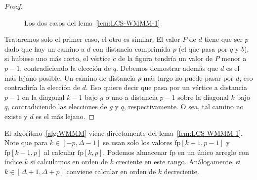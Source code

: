 \begin{proof}
\begin{figure}[ht]
      \caption{Los dos casos del lema~\ref{lem:LCS-WMMM-1}}
      \label{fig:LCS-WMMM-lemma-1}
    \end{figure}
    Trataremos solo el primer caso,
    el otro es similar.
    El valor \(P\) de \(d\) tiene que ser \(p\)
    dado que hay un camino a \(d\) con distancia comprimida \(p\)
    (el que pasa por \(q\) y \(b\)),
    si hubiese uno más corto,
    el vértice \(c\) de la figura tendría un valor de \(P\) menor a \(p - 1\),
    contradiciendo la elección de \(q\).
    Debemos demostrar además que \(d\) es el más lejano posible.
    Un camino de distancia \(p\) más largo no puede pasar por \(d\),
    eso contradiría la elección de \(d\).
    Eso quiere decir que pasa por un vértice a distancia \(p - 1\)
    en la diagonal \(k - 1\) bajo \(g\)
    o uno a distancia \(p - 1\) sobre la diagonal \(k\) bajo  \(q\),
    contradiciendo las elecciones de \(g\) y \(q\),
    respectivamente.
    O sea,
    tal camino no existe y \(d\) es el más lejano.
  \end{proof}
  El algoritmo~\ref{alg:WMMM} viene directamente del lema~\ref{lem:LCS-WMMM-1}.
  Note que para \(k \in [-p, \Delta - 1]\)
  se usan solo los valores \(\mathrm{fp}[k + 1, p - 1]\)
  y \(\mathrm{fp}[k - 1, p]\)
  al calcular \(\mathrm{fp}[k, p]\).
  Podemos almacenar \(\mathrm{fp}\) en un único arreglo con índice \(k\)
  si calculamos en orden de \(k\) creciente en este rango.
  Análogamente,
  si \(k \in [\Delta + 1, \Delta + p]\)
  conviene calcular en orden de \(k\) decreciente.
